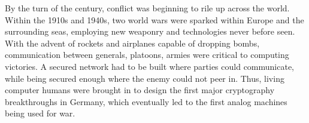 \documentclass[../computer-history.tex]{subfiles}
\begin{document}
By the turn of the century, conflict was beginning to rile up across the world. Within the 1910s and 1940s, two world wars were sparked within
Europe and the surrounding seas, employing new weaponry and technologies never before seen. With the advent of rockets and airplanes capable of dropping bombs,
communication between generals, platoons, armies were critical to computing victories. A secured network had to be built where parties could communicate,
while being secured enough where the enemy could not peer in. Thus, living computer humans were brought in to design the first major cryptography breakthroughs in Germany,
which eventually led to the first analog machines being used for war\cite{cmphistory}.

\biblio
\end{document}
